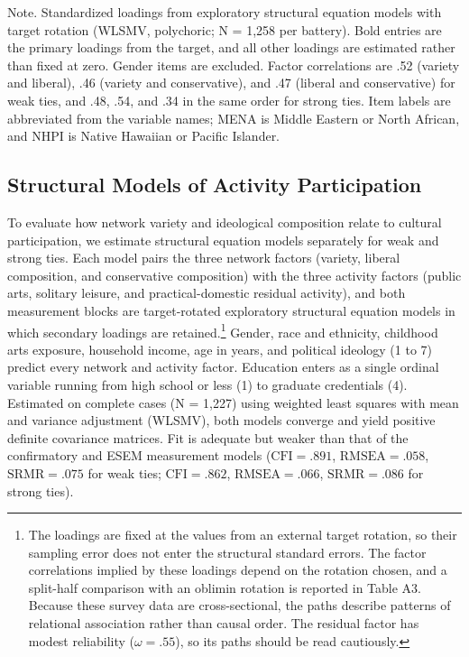 \documentclass[
  12pt
]{article}
\begin{document}
Note. Standardized loadings from exploratory structural equation models with target rotation (WLSMV, polychoric; N = 1,258 per battery). Bold entries are the primary loadings from the target, and all other loadings are estimated rather than fixed at zero. Gender items are excluded. Factor correlations are .52 (variety and liberal), .46 (variety and conservative), and .47 (liberal and conservative) for weak ties, and .48, .54, and .34 in the same order for strong ties. Item labels are abbreviated from the variable names; MENA is Middle Eastern or North African, and NHPI is Native Hawaiian or Pacific Islander.


\subsection{Structural Models of Activity Participation}\label{structural-models-of-activity-participation}

To evaluate how network variety and ideological composition relate to cultural participation, we estimate structural equation models separately for weak and strong ties. Each model pairs the three network factors (variety, liberal composition, and conservative composition) with the three activity factors (public arts, solitary leisure, and practical-domestic residual activity), and both measurement blocks are target-rotated exploratory structural equation models in which secondary loadings are retained.\footnote{The loadings are fixed at the values from an external target rotation, so their sampling error does not enter the structural standard errors. The factor correlations implied by these loadings depend on the rotation chosen, and a split-half comparison with an oblimin rotation is reported in Table A3. Because these survey data are cross-sectional, the paths describe patterns of relational association rather than causal order. The residual factor has modest reliability ($\omega = .55$), so its paths should be read cautiously.} Gender, race and ethnicity, childhood arts exposure, household income, age in years, and political ideology (1 to 7) predict every network and activity factor. Education enters as a single ordinal variable running from high school or less (1) to graduate credentials (4). Estimated on complete cases (N = 1,227) using weighted least squares with mean and variance adjustment (WLSMV), both models converge and yield positive definite covariance matrices. Fit is adequate but weaker than that of the confirmatory and ESEM measurement models ($\text{CFI} = .891$, $\text{RMSEA} = .058$, $\text{SRMR} = .075$ for weak ties; $\text{CFI} = .862$, $\text{RMSEA} = .066$, $\text{SRMR} = .086$ for strong ties).
\end{document}
